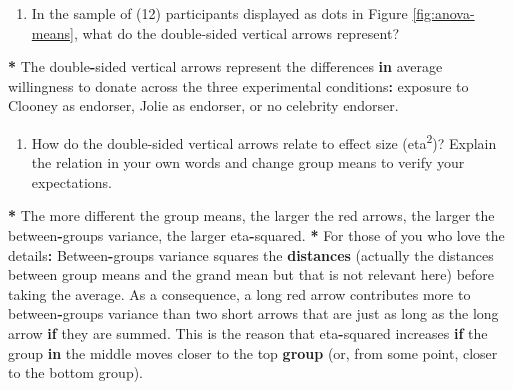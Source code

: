 \documentclass[a4paper]{book}
\newenvironment{Shaded}{\begin{snugshade}}{\end{snugshade}}
\newcommand{\KeywordTok}[1]{\textcolor[rgb]{0,0,0}{\textbf{#1}}}
\newcommand{\StringTok}[1]{\textcolor[rgb]{0.00,0.00,0.00}{#1}}
\newcommand{\ControlFlowTok}[1]{\textcolor[rgb]{0.00,0.00,0.00}{\textbf{#1}}}
\newcommand{\OperatorTok}[1]{\textcolor[rgb]{0.00,0.00,0.00}{\textbf{#1}}}
\newcommand{\NormalTok}[1]{#1}
\providecommand{\tightlist}{%
  \setlength{\itemsep}{0pt}\setlength{\parskip}{0pt}}
\theoremstyle{definition}
\theoremstyle{definition}
\theoremstyle{definition}
\theoremstyle{remark}
\begin{document}
\begin{enumerate}
\def\labelenumi{\arabic{enumi}.}
\tightlist
\item
  In the sample of (12) participants displayed as dots in Figure
  \ref{fig:anova-means}, what do the double-sided vertical arrows
  represent?
\end{enumerate}

\begin{Shaded}
\begin{Highlighting}[]
\OperatorTok{*}\StringTok{ }\NormalTok{The double}\OperatorTok{-}\NormalTok{sided vertical arrows represent the differences }\ControlFlowTok{in}\NormalTok{ average}
\NormalTok{willingness to donate across the three experimental conditions}\OperatorTok{:}\StringTok{ }\NormalTok{exposure to}
\NormalTok{Clooney as endorser, Jolie as endorser, or no celebrity endorser.}
\end{Highlighting}
\end{Shaded}

\begin{enumerate}
\def\labelenumi{\arabic{enumi}.}
\setcounter{enumi}{1}
\tightlist
\item
  How do the double-sided vertical arrows relate to effect size
  (eta\textsuperscript{2})? Explain the relation in your own words and
  change group means to verify your expectations.
\end{enumerate}

\begin{Shaded}
\begin{Highlighting}[]
\OperatorTok{*}\StringTok{ }\NormalTok{The more different the group means, the larger the red arrows, the larger the}
\NormalTok{between}\OperatorTok{-}\NormalTok{groups variance, the larger eta}\OperatorTok{-}\NormalTok{squared.}
\OperatorTok{*}\StringTok{ }\NormalTok{For those of you who love the details}\OperatorTok{:}\StringTok{ }\NormalTok{Between}\OperatorTok{-}\NormalTok{groups variance squares the}
\KeywordTok{distances}\NormalTok{ (actually the distances between group means and the grand mean but}
\NormalTok{that is not relevant here) before taking the average. As a consequence, a long}
\NormalTok{red arrow contributes more to between}\OperatorTok{-}\NormalTok{groups variance than two short arrows}
\NormalTok{that are just as long as the long arrow }\ControlFlowTok{if}\NormalTok{ they are summed. This is the reason}
\NormalTok{that eta}\OperatorTok{-}\NormalTok{squared increases }\ControlFlowTok{if}\NormalTok{ the group }\ControlFlowTok{in}\NormalTok{ the middle moves closer to the top}
\KeywordTok{group}\NormalTok{ (or, from some point, closer to the bottom group).}
\end{Highlighting}
\end{Shaded}
\end{document}
